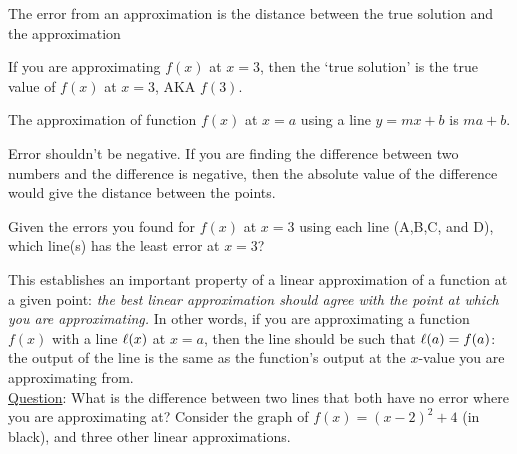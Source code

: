 \documentclass[handout,nooutcomes]{ximera}
\begin{document}
\begin{question}
\begin{hint}
The error from an approximation is the distance between the true solution and the approximation
\end{hint}
\begin{hint}
If you are approximating $f(x)$ at $x=3$, then the `true solution' is the true value of $f(x)$ at $x=3$, AKA $f(3)$.
\end{hint}
\begin{hint}
The approximation of function $f(x)$ at $x=a$ using a line $y=mx+b$ is $ma+b$.
\end{hint}
\begin{hint}
Error shouldn't be negative. If you are finding the difference
between two numbers and the difference is negative, then the absolute
value of the difference would give the distance between the points.
\end{hint}
\end{question}

\begin{question}
Given the errors you found for $f(x)$ at $x=3$ using  each line (A,B,C, and D), which line(s) has the least error at $x=3$?
\begin{selectAll}
\end{selectAll}
\end{question}


This establishes an important property of a linear approximation
of a function at a given point: {\it the best linear approximation
should agree with the point at which you are approximating.}
In other words, if you are approximating a function $f(x)$ with a
line $\ell(x)$ at $x=a$, then the line should be such that $\ell(a)=f(a)$:
the output of the line is the same as the function's output at the $x$-value you are approximating from.\\

\underline{Question}: What is the difference between two lines that both
have no error where you are approximating at?
Consider the graph of $f(x)= (x-2)^2 + 4$ (in black), and three other linear approximations.
\end{document}
